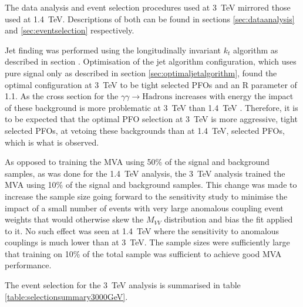 The data analysis and event selection procedures used at 3~TeV mirrored those used at 1.4~TeV.  Descriptions of both can be found in sections \ref{sec:dataanalysis} and \ref{sec:eventselection} respectively.  

Jet finding was performed using the longitudinally invariant $k_{t}$ algorithm as described in section \label{sec:jetpairing}.  Optimisation of the jet algorithm configuration, which uses pure signal only as described in section \ref{sec:optimaljetalgorithm}, found the optimal configuration at 3~TeV to be tight selected PFOs and an R parameter of 1.1.  As the cross section for the $\gamma\gamma \rightarrow \text{Hadrons}$ increases with energy the impact of these background is more problematic at 3~TeV than 1.4~TeV \cite{arXiv:1209.4039}.  Therefore, it is to be expected that the optimal PFO selection at 3~TeV is more aggressive, tight selected PFOs, at vetoing these backgrounds than at 1.4~TeV, selected PFOs, which is what is observed.   

As opposed to training the MVA using 50\% of the signal and background samples, as was done for the 1.4~TeV analysis, the 3~TeV analysis trained the MVA using 10\% of the signal and background samples.  This change was made to increase the sample size going forward to the sensitivity study to minimise the impact of a small number of events with very large anomalous coupling event weights that would otherwise skew the $M_{VV}$ distribution and bias the fit applied to it.  No such effect was seen at 1.4~TeV where the sensitivity to anomalous couplings is much lower than at 3~TeV.  The sample sizes were sufficiently large that training on 10\% of the total sample was sufficient to achieve good MVA performance.  

The event selection for the 3~TeV analysis is summarised in table \ref{table:selectionsummary3000GeV}.

